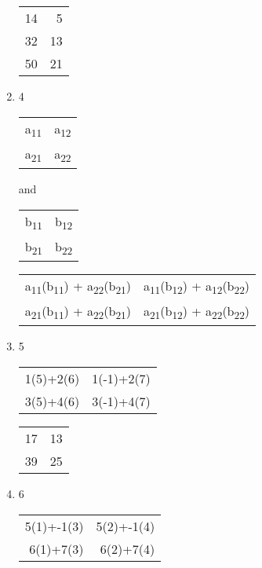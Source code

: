 \documentclass[11pt]{article}
\begin{document}
\begin{enumerate}
\begin{center}
\begin{tabular}{rr}
14 & 5\\
32 & 13\\
50 & 21\\
\end{tabular}
\end{center}
\item 4
\label{sec:org7e33447}
\begin{center}
\begin{tabular}{ll}
a\textsubscript{11} & a\textsubscript{12}\\
a\textsubscript{21} & a\textsubscript{22}\\
\end{tabular}
\end{center}
and
\begin{center}
\begin{tabular}{ll}
b\textsubscript{11} & b\textsubscript{12}\\
b\textsubscript{21} & b\textsubscript{22}\\
\end{tabular}
\end{center}

\begin{center}
\begin{tabular}{ll}
a\textsubscript{11}(b\textsubscript{11}) + a\textsubscript{22}(b\textsubscript{21}) & a\textsubscript{11}(b\textsubscript{12}) + a\textsubscript{12}(b\textsubscript{22})\\
a\textsubscript{21}(b\textsubscript{11}) + a\textsubscript{22}(b\textsubscript{21}) & a\textsubscript{21}(b\textsubscript{12}) + a\textsubscript{22}(b\textsubscript{22})\\
\end{tabular}
\end{center}
\item 5
\label{sec:org04bb211}
\begin{center}
\begin{tabular}{rr}
1(5)+2(6) & 1(-1)+2(7)\\
3(5)+4(6) & 3(-1)+4(7)\\
\end{tabular}
\end{center}

\begin{center}
\begin{tabular}{rr}
17 & 13\\
39 & 25\\
\end{tabular}
\end{center}
\item 6
\label{sec:org40fd589}
\begin{center}
\begin{tabular}{rr}
5(1)+-1(3) & 5(2)+-1(4)\\
6(1)+7(3) & 6(2)+7(4)\\
\end{tabular}
\end{center}


\end{enumerate}
\end{document}
